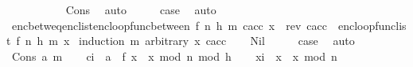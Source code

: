 \begin{isabellebody}
\ \ \ \ \ \ \ \ {\isacharparenright}{\kern0pt}{\isachardoublequoteclose}\ \isamarkupfalse%
\ Cons\ \isamarkupfalse%
\ auto\isanewline
\ \ \isamarkupfalse%
\ \isamarkupfalse%
\ {\isacharquery}{\kern0pt}case\ \isamarkupfalse%
\ auto\isanewline
{}\isamarkupfalse%
%
\endisatagproof
{\isafoldproof}%
%
\isadelimproof
\ \isanewline
%
\endisadelimproof
\isanewline
{}\isamarkupfalse%
\ enc{\isacharunderscore}{\kern0pt}betw{\isacharunderscore}{\kern0pt}eq{\isacharunderscore}{\kern0pt}enc{\isacharunderscore}{\kern0pt}list{\isacharcolon}{\kern0pt}{\isachardoublequoteopen}enc{\isacharunderscore}{\kern0pt}loop{\isacharunderscore}{\kern0pt}func{\isacharunderscore}{\kern0pt}between\ {\isacharparenleft}{\kern0pt}f{\isacharcomma}{\kern0pt}\ n{\isacharcomma}{\kern0pt}\ h{\isacharcomma}{\kern0pt}\ m{\isacharparenright}{\kern0pt}\ c{\isacharunderscore}{\kern0pt}acc\ x\ {\isacharequal}{\kern0pt}\ rev\ c{\isacharunderscore}{\kern0pt}acc\ {\isacharat}{\kern0pt}\ {\isacharparenleft}{\kern0pt}enc{\isacharunderscore}{\kern0pt}loop{\isacharunderscore}{\kern0pt}func{\isacharunderscore}{\kern0pt}list\ {\isacharparenleft}{\kern0pt}f{\isacharcomma}{\kern0pt}\ n{\isacharcomma}{\kern0pt}\ h{\isacharcomma}{\kern0pt}\ m{\isacharparenright}{\kern0pt}\ x{\isacharparenright}{\kern0pt}{\isachardoublequoteclose}\isanewline
%
\isadelimproof
%
\endisadelimproof
%
\isatagproof
{}\isamarkupfalse%
\ {\isacharparenleft}{\kern0pt}induction\ m\ arbitrary{\isacharcolon}{\kern0pt}\ x\ c{\isacharunderscore}{\kern0pt}acc{\isacharparenright}{\kern0pt}\isanewline
\ \ \isamarkupfalse%
\ Nil\isanewline
\ \ \isamarkupfalse%
\ \isamarkupfalse%
\ {\isacharquery}{\kern0pt}case\ \isamarkupfalse%
\ auto\isanewline
{}\isamarkupfalse%
\isanewline
\ \ \isamarkupfalse%
\ {\isacharparenleft}{\kern0pt}Cons\ a\ m{\isacharparenright}{\kern0pt}\isanewline
\ \ \isamarkupfalse%
\ {\isacharquery}{\kern0pt}c{\isacharunderscore}{\kern0pt}i\ {\isacharequal}{\kern0pt}\ {\isachardoublequoteopen}a\ {\isacharbrackleft}{\kern0pt}{\isasymoplus}{\isacharbrackright}{\kern0pt}\ f\ {\isacharparenleft}{\kern0pt}{\isacharparenleft}{\kern0pt}x\ {\isacharasterisk}{\kern0pt}\ x\ mod\ n{\isacharparenright}{\kern0pt}\ mod\ {}{\isacharcircum}{\kern0pt}h{\isacharparenright}{\kern0pt}{\isachardoublequoteclose}\isanewline
\ \ \isamarkupfalse%
\ {\isacharquery}{\kern0pt}x{\isacharunderscore}{\kern0pt}i\ {\isacharequal}{\kern0pt}\ {\isachardoublequoteopen}x\ {\isacharasterisk}{\kern0pt}\ x\ mod\ n{\isachardoublequoteclose}\isanewline

\end{isabellebody}
